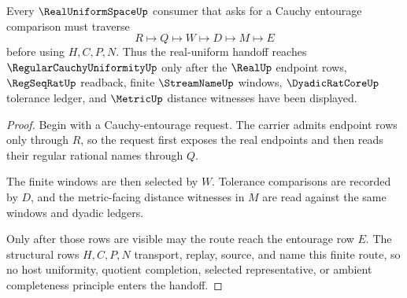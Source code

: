 \begin{theorem}
\label{thm:real-uniform-space-cauchy-entourage-route}
Every $\RealUniformSpaceUp$ consumer that asks for a Cauchy entourage comparison must traverse
$$
R\longmapsto Q\longmapsto W\longmapsto D\longmapsto M\longmapsto E
$$
before using $H,C,P,N$. Thus the real-uniform handoff reaches $\RegularCauchyUniformityUp$ only after the $\RealUp$ endpoint rows, $\RegSeqRatUp$ readback, finite $\StreamNameUp$ windows, $\DyadicRatCoreUp$ tolerance ledger, and $\MetricUp$ distance witnesses have been displayed.
\end{theorem}
\begin{proof}
Begin with a Cauchy-entourage request. The carrier admits endpoint rows only through $R$, so the request first exposes the real endpoints and then reads their regular rational names through $Q$.

The finite windows are then selected by $W$. Tolerance comparisons are recorded by $D$, and the metric-facing distance witnesses in $M$ are read against the same windows and dyadic ledgers.

Only after those rows are visible may the route reach the entourage row $E$. The structural rows $H,C,P,N$ transport, replay, source, and name this finite route, so no host uniformity, quotient completion, selected representative, or ambient completeness principle enters the handoff.
\end{proof}





